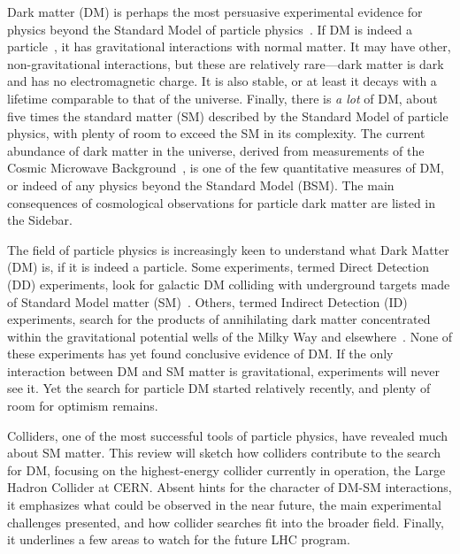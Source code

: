 Dark matter (DM) is perhaps the most persuasive experimental evidence for physics beyond the Standard Model of particle physics~\cite{Bertone:2016nfn}. 
If DM is indeed a particle~\cite{Steigman:1979kw}, it has gravitational interactions with normal matter.
It may have other, non-gravitational interactions, but these are relatively rare---dark matter is dark and has no electromagnetic charge.
It is also stable, or at least it decays with a lifetime comparable to that of the universe.
Finally, there is {\it a lot} of DM, about five times the standard matter (SM) described by the Standard Model of particle physics, with plenty of room to exceed the SM in its complexity.
The current abundance of dark matter in the universe, derived from measurements of the Cosmic Microwave Background~\cite{Ade:2015xua}, is one of the few quantitative measures of DM, or indeed of any physics beyond the Standard Model (BSM). The main consequences of cosmological observations for particle dark matter are listed in the Sidebar. 



The field of particle physics is increasingly keen to understand what Dark Matter (DM) is, if it is indeed a particle. 
Some experiments, termed Direct Detection (DD) experiments, look for galactic DM colliding with underground targets made of Standard Model matter (SM)~\cite{0954-3899-43-1-013001}.
Others, termed Indirect Detection (ID) experiments, search for the products of annihilating dark matter concentrated within the gravitational potential wells of the Milky Way and elsewhere~\cite{Gaskins:2016cha}.
None of these experiments has yet found conclusive evidence of DM.
If the only interaction between DM and SM matter is gravitational, experiments will never see it.
Yet the search for particle DM started relatively recently, and plenty of room for optimism remains.

Colliders, one of the most successful tools of particle physics, have revealed much about SM matter.
This review will sketch how colliders contribute to the search for DM, focusing on the highest-energy collider currently in operation, the Large Hadron Collider at CERN.
Absent hints for the character of DM-SM interactions, it emphasizes what could be observed in the near future, the main experimental challenges presented, and how collider searches fit into the broader field.
Finally, it underlines a few areas to watch for the future LHC program.

